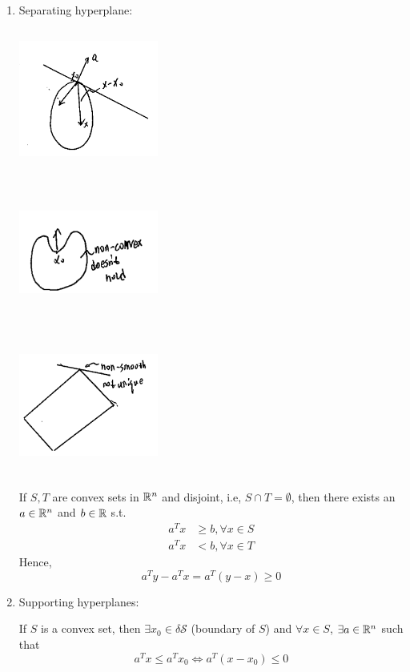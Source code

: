 \begin{enumerate}
	\item Separating hyperplane: 
	\begin{marginfigure}
		\centering
		\includegraphics[width=1.8in,height=1.8in]{figures/ch08/figure1030_3.png}
	\end{marginfigure}
	
	\begin{marginfigure}
		\centering
		\includegraphics[width=1.8in,height=1.8in]{figures/ch08/figure1030_4.png}
	\end{marginfigure}
	
	\begin{marginfigure}
		\centering
		\includegraphics[width=1.8in,height=1.8in]{figures/ch08/figure1030_5.png}
	\end{marginfigure}
	If $S,T$ are convex sets in $\mathbb{R}^n$ and disjoint, i.e, $S\cap T = \emptyset$, then there exists an $a \in \mathbb{R}^n$ and $b\in \mathbb{R}$ s.t.	
	\begin{align*}
	a^Tx&\geq b, \forall x\in S\\
	a^Tx &<b, \forall x\in T                              
	\end{align*}
	Hence,
	 $$a^Ty - a^T x = a^T(y-x) \geq 0$$
	

	\item Supporting hyperplanes:


	If $S$ is a convex set, then $\exists x_0\in \delta \mathcal{S}$ (boundary of $S$) and $\forall x\in S$, $\exists a\in \mathbb{R}^n$ such that 
	$$a^Tx \leq a^Tx_0\Leftrightarrow a^T(x - x_0)\leq 0$$

	
\end{enumerate}

